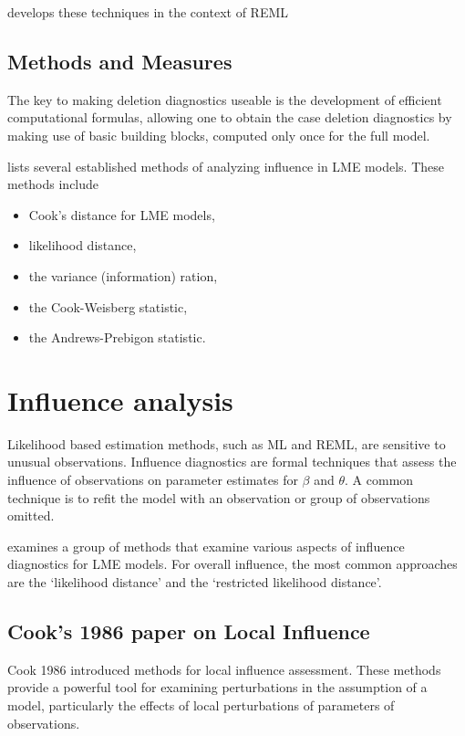 \documentclass[12pt, a4paper]{report}
\theoremstyle{plain}
\theoremstyle{definition}
\theoremstyle{remark}
\begin{document}
\citet{Christiansen} develops these techniques in the context of
REML

\subsection{Methods and Measures}
The key to making deletion diagnostics useable is the development of efficient
computational formulas, allowing one to obtain the  case deletion diagnostics by
making use of basic building blocks, computed only once for the full model.

\citet{Zewotir} lists several established methods of analyzing influence in LME models. These methods include \begin{itemize}
\item Cook's distance for LME models,
\item {} likelihood distance,
\item the variance (information) ration,
\item the  Cook-Weisberg statistic,
\item the  Andrews-Prebigon statistic.
\end{itemize}


\newpage
\section{Influence analysis} %

Likelihood based estimation methods, such as ML and REML, are sensitive to unusual observations. Influence diagnostics are formal techniques that assess the influence of observations on parameter estimates for $\beta$ and $\theta$. A common technique is to refit the model with an observation or group of observations omitted.

\citet{west} examines a group of methods that examine various aspects of influence diagnostics for LME models.
For overall influence, the most common approaches are the `likelihood distance' and the `restricted likelihood distance'.

\subsection{Cook's 1986 paper on Local Influence}%
Cook 1986 introduced methods for local influence assessment. These methods provide a powerful tool for examining perturbations in the assumption of a model, particularly the effects of local perturbations of parameters of observations.
\end{document}
